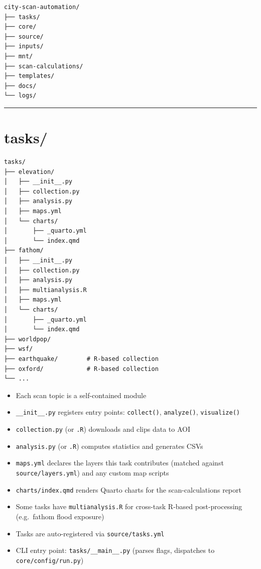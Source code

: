 \documentclass[
  letterpaper,
  DIV=11,
  numbers=noendperiod]{scrreprt}
\providecommand{\tightlist}{%
  \setlength{\itemsep}{0pt}\setlength{\parskip}{0pt}}
\begin{document}
\begin{verbatim}
city-scan-automation/
├── tasks/
├── core/
├── source/
├── inputs/
├── mnt/
├── scan-calculations/
├── templates/
├── docs/
└── logs/
\end{verbatim}

\begin{center}\rule{0.5\linewidth}{0.5pt}\end{center}

\section{tasks/}\label{tasks}

\begin{verbatim}
tasks/
├── elevation/
│   ├── __init__.py
│   ├── collection.py
│   ├── analysis.py
│   ├── maps.yml
│   └── charts/
│       ├── _quarto.yml
│       └── index.qmd
├── fathom/
│   ├── __init__.py
│   ├── collection.py
│   ├── analysis.py
│   ├── multianalysis.R
│   ├── maps.yml
│   └── charts/
│       ├── _quarto.yml
│       └── index.qmd
├── worldpop/
├── wsf/
├── earthquake/        # R-based collection
├── oxford/            # R-based collection
└── ...
\end{verbatim}

\begin{itemize}
\tightlist
\item
  Each scan topic is a self-contained module
\item
  \texttt{\_\_init\_\_.py} registers entry points: \texttt{collect()},
  \texttt{analyze()}, \texttt{visualize()}
\item
  \texttt{collection.py} (or \texttt{.R}) downloads and clips data to
  AOI
\item
  \texttt{analysis.py} (or \texttt{.R}) computes statistics and
  generates CSVs
\item
  \texttt{maps.yml} declares the layers this task contributes (matched
  against \texttt{source/layers.yml}) and any custom map scripts
\item
  \texttt{charts/index.qmd} renders Quarto charts for the
  scan-calculations report
\item
  Some tasks have \texttt{multianalysis.R} for cross-task R-based
  post-processing (e.g.~fathom flood exposure)
\item
  Tasks are auto-registered via \texttt{source/tasks.yml}
\item
  CLI entry point: \texttt{tasks/\_\_main\_\_.py} (parses flags,
  dispatches to \texttt{core/config/run.py})
\end{itemize}
\end{document}
